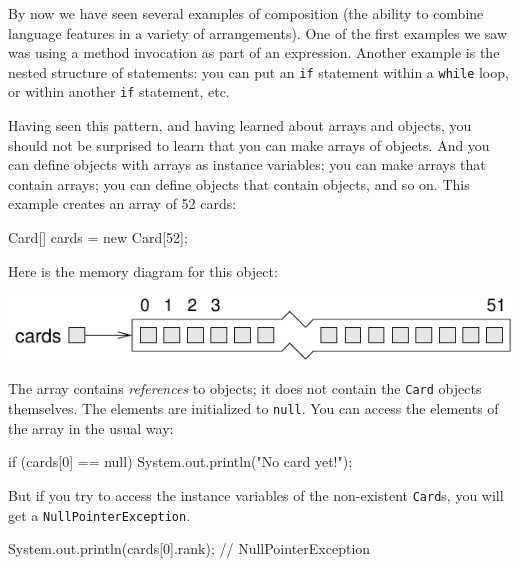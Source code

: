 \documentclass[12pt]{book}
\theoremstyle{exercise}
\newcommand{\java}[1]{\lstinline{#1}} %
\begin{document}


By now we have seen several examples of composition (the ability to combine language features in a variety of arrangements).
One of the first examples we saw was using a method invocation as part of an expression.
Another example is the nested structure of statements: you can put an \java{if} statement within a \java{while} loop, or within
another \java{if} statement, etc.

Having seen this pattern, and having learned about arrays and objects, you should not be surprised to learn that you can make arrays of objects.
And you can define objects with arrays as instance variables; you can make arrays that contain arrays; you can define objects that contain objects, and so on.
This example creates an array of 52 cards:

\begin{code}
    Card[] cards = new Card[52];
\end{code}


Here is the memory diagram for this object:

\begin{center}
\includegraphics{figs/cardarray.pdf}
\end{center}


The array contains {\em references} to objects; it does not contain the \java{Card} objects themselves.
The elements are initialized to \java{null}.
You can access the elements of the array in the usual way:

\begin{code}
    if (cards[0] == null) {
        System.out.println("No card yet!");
    }
\end{code}


But if you try to access the instance variables of the non-existent \java{Card}s, you will get a \java{NullPointerException}.

\begin{code}
    System.out.println(cards[0].rank);  // NullPointerException
\end{code}
\end{document}
